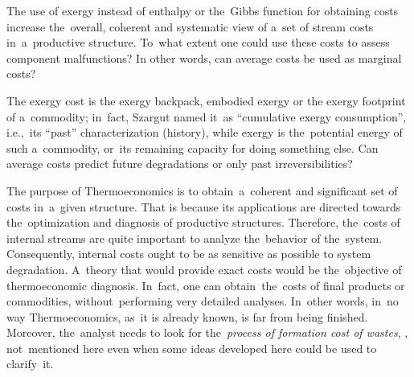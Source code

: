 \documentclass[energies,article,accept,moreauthors,pdftex]{Definitions/mdpi}
\begin{document}
The use of exergy instead of enthalpy or the~Gibbs function for obtaining costs increase the~overall, coherent and systematic view of a~set of stream costs in~a~productive structure. To~what extent one could use these costs to assess component malfunctions? In other words, can average costs be used as marginal costs?

The exergy cost is the exergy backpack, embodied exergy or the exergy footprint of a~commodity; in~fact, Szargut named it~as “cumulative exergy consumption”, \cite{Szargut1988} i.e.,~its “past” characterization (history), while exergy is the~potential energy of such a~commodity, or~its remaining capacity for doing something else. Can average costs predict future degradations or only past irreversibilities?

The purpose of Thermoeconomics is to obtain~a~coherent and significant set of costs in~a~given structure. That is because its applications are directed towards the~optimization and diagnosis of productive structures. Therefore, the~costs of internal streams are quite important to analyze the~behavior of the~system. Consequently, internal costs ought to be as sensitive as possible to system degradation. A~theory that would provide exact costs would be the~objective of thermoeconomic diagnosis. In~fact, one can obtain~the~costs of final products or commodities, without~performing very detailed analyses. In~other words, in~no way Thermoeconomics, as~it is already known, is far from being finished. Moreover, the~analyst needs to look for the~\emph{process of formation cost of wastes}, \cite{Torres2008}, not~mentioned here even when some ideas developed here could be used to clarify~it.
\end{document}

